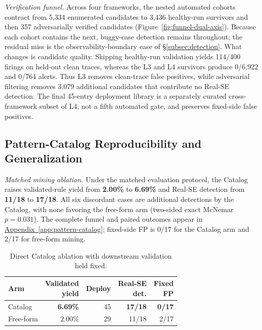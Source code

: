 \documentclass[sigconf,nonacm]{acmart}
\newcommand{\suppappendix}[1]{%
  \href{https://github.com/vivia-an/trainaudit-vldb-artifact/blob/vldb-2027-artifact-v1.0.1/paper/appendix_supplement.pdf}%
  {Appendix~\ref*{#1}}}
\begin{document}
\emph{Verification funnel.}
Across four frameworks, the nested automated cohorts contract from 5{,}334
enumerated candidates to 3{,}436 healthy-run survivors and then 357
adversarially verified candidates (Figure~\ref{fig:funnel-dual-axis}). Because
each cohort contains the next, buggy-case detection remains
\textbf{\RealSEDetFrac} throughout; the residual miss is the observability-boundary
case of \S\ref{subsec:detection}. What changes is candidate quality. Skipping
healthy-run validation yields 114/400 firings on held-out clean traces, whereas
the L3 and L4 survivors produce 0/6{,}922 and 0/764 alerts. Thus L3 removes
clean-trace false positives, while adversarial filtering removes 3{,}079
additional candidates that contribute no Real-SE detection. The final 45-entry
deployment library is a separately curated cross-framework subset of L4, not a
fifth automated gate, and preserves \textbf{\FixedFPFrac} fixed-side false
positives.

\subsection{Pattern-Catalog Reproducibility and Generalization}
\label{subsec:catalog-evaluation}

\noindent\emph{Matched mining ablation.}
Under the matched evaluation protocol, the Catalog raises validated-rule yield
from \textbf{2.00\%} to \textbf{6.69\%} and Real-SE detection from
\textbf{11/18} to \textbf{17/18}. All six discordant cases are additional
detections by the Catalog, with none favoring the free-form arm (two-sided
exact McNemar $p{=}0.031$). The complete funnel and paired outcomes appear in
\suppappendix{app:pattern-catalog}; fixed-side FP is 0/17 for the Catalog arm
and 2/17 for free-form mining.

\begin{table}[t]
\centering\scriptsize
\setlength{\tabcolsep}{3pt}
\caption{Direct Catalog ablation with downstream validation held fixed.}
\label{tab:catalog-direct}
\begin{tabular}{@{}lrrrr@{}}
\toprule
Arm & \shortstack{Validated\\yield} & Deploy & \shortstack{Real-SE\\det.} & \shortstack{Fixed\\FP} \\
\midrule
Catalog   & \textbf{6.69\%} & 45 & \textbf{17/18} & \textbf{0/17} \\
Free-form & 2.00\%          & 29 & 11/18          & 2/17 \\
\bottomrule
\end{tabular}
\end{table}
\end{document}
